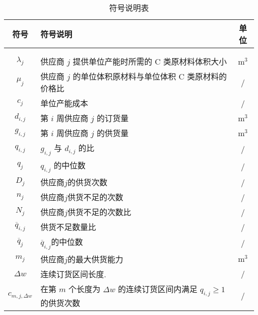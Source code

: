 \documentclass[11pt, fontset = windows]{article}
\begin{document}
\begin{center}
    \begin{longtable}{clc}
        \toprule
        符号                   & 符号说明                                                     & 单位    \\ \midrule
        \endhead
        \caption{符号说明表}\\
        \label{符号说明表}\\
        \endlastfoot
        $\lambda_{j}$        & 供应商 $j$ 提供单位产能时所需的 C 类原材料体积大小                            & m$^3$ \\
        $\mu_{j} $           & 供应商 $j$ 的单位体积原材料与单位体积 C 类原材料的价格比                         & /     \\
        $c_j$                & 单位产能成本                                                   & /     \\
        $d_{i,j}$            & 第 $i$ 周供应商 $j$ 的订货量                                      & m$^3$ \\
        $g_{i,j}$            & 第 $i$ 周供应商 $j$ 的供货量                                      & m$^3$ \\
        $q_{i,j}$            & $g_{i,j}$ 与 $d_{i,j}$ 的比                                 & /     \\
        $q_j$                & $q_{i,j}$  的中位数                                          & /     \\
        $D_j$                & 供应商$j$的供货次数                                              & /     \\
        $n_j$                & 供应商$j$供货不足的次数                                            & /     \\
        $N_j$                & 供应商$j$供货不足的次数比                                           & /     \\
        $\overline{q}_{i,j}$ & 供货不足数量比                                                  & /     \\
        $\overline{q}_{j}$   & $\overline{q}_{i,j}$的中位数                                 & /     \\
        $m_{j} $             & 供应商$j$的最大供货能力                                            & m$^3$ \\
        $\Delta w$           & 连续订货区间长度.                                                & /     \\
        $c_{m,j,\Delta w}$   & 在第 $m$ 个长度为 $\Delta w$ 的连续订货区间内满足 $q_{i,j} \geq 1$ 的供货次数 & /     \\

\end{longtable}
\end{center}
\end{document}
